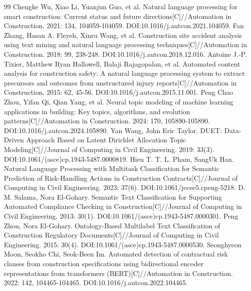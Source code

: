 \documentclass[11pt]{ctexart}
\begin{document}
\begin{thebibliography}{99}
 Chengke Wu, Xiao Li, Yuanjun Guo, et al. Natural language processing for smart construction: Current status and future directions[C]//Automation in Construction. 2021: 134, 104059-104059. DOI:10.1016/j.autcon.2021.104059.
 Fan Zhang, Hasan A. Fleyeh, Xinru Wang, et al. Construction site accident analysis using text mining and natural language processing techniques[C]//Automation in Construction. 2018: 99, 238-248. DOI:10.1016/j.autcon.2018.12.016.
 Antoine J.‐P. Tixier, Matthew Ryan Hallowell, Balaji Rajagopalan, et al. Automated content analysis for construction safety: A natural language processing system to extract precursors and outcomes from unstructured injury reports[C]//Automation in Construction. 2015: 62, 45-56. DOI:10.1016/j.autcon.2015.11.001.
 Peng Chao Zhou, Yifan Qi, Qian Yang, et al. Neural topic modeling of machine learning applications in building: Key topics, algorithms, and evolution patterns[C]//Automation in Construction. 2024: 170, 105890-105890. DOI:10.1016/j.autcon.2024.105890.
 Yan Wang, John Eric Taylor. DUET: Data-Driven Approach Based on Latent Dirichlet Allocation Topic Modeling[C]//Journal of Computing in Civil Engineering. 2019: 33(3). DOI:10.1061/(asce)cp.1943-5487.0000819.
 Hieu T. T. L. Pham, SangUk Han. Natural Language Processing with Multitask Classification for Semantic Prediction of Risk-Handling Actions in Construction Contracts[C]//Journal of Computing in Civil Engineering. 2023: 37(6). DOI:10.1061/jccee5.cpeng-5218.
 D. M. Salama, Nora El-Gohary. Semantic Text Classification for Supporting Automated Compliance Checking in Construction[C]//Journal of Computing in Civil Engineering. 2013: 30(1). DOI:10.1061/(asce)cp.1943-5487.0000301.
 Peng Zhou, Nora El-Gohary. Ontology-Based Multilabel Text Classification of Construction Regulatory Documents[C]//Journal of Computing in Civil Engineering. 2015: 30(4). DOI:10.1061/(asce)cp.1943-5487.0000530.
 Seonghyeon Moon, Seokho Chi, Seok-Been Im. Automated detection of contractual risk clauses from construction specifications using bidirectional encoder representations from transformers (BERT)[C]//Automation in Construction. 2022: 142, 104465-104465. DOI:10.1016/j.autcon.2022.104465.
\end{thebibliography}
\end{document}
